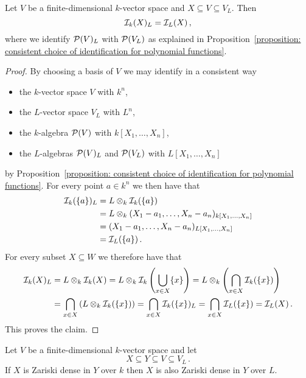 \begin{corollary}
  Let $V$ be a finite-dimensional $k$-vector space and $X \subseteq V \subseteq V_L$.
  Then
  \[
      \mathcal{I}_k(X)_L
    = \mathcal{I}_L(X) \,,
  \]
  where we identify $\mathcal{P}(V)_L$ with $\mathcal{P}(V_L)$ as explained in Proposition~\ref{proposition: consistent choice of identification for polynomial functions}.
\end{corollary}


\begin{proof}
  By choosing a basis of $V$ we may identify in a consistent way
  \begin{itemize}
    \item
      the $k$-vector space $V$ with $k^n$,
    \item
      the $L$-vector space $V_L$ with $L^n$,
    \item
      the $k$-algebra $\mathcal{P}(V)$ with $k[X_1, \dotsc, X_n]$,
    \item
      the $L$-algebras $\mathcal{P}(V)_L$ and $\mathcal{P}(V_L)$ with $L[X_1, \dotsc, X_n]$
  \end{itemize}
  by Proposition~\ref{proposition: consistent choice of identification for polynomial functions}.
  For every point $a \in k^n$ we then have that
  \begin{align*}
        \mathcal{I}_k(\{a\})_L
    &=  L \mathbin{\otimes}_k \mathcal{I}_k(\{a\}) \\
    &=  L \mathbin{\otimes}_k ( X_1 - a_1, \dotsc, X_n - a_n )_{ k[X_1, \dotsc, X_n] } \\
    &=  ( X_1 - a_1, \dotsc, X_n - a_n )_{ L[X_1, \dotsc, X_n] }  \\
    &=  \mathcal{I}_L(\{a\}) \,.
  \end{align*}
  For every subset $X \subseteq W$ we therefore have that
  \begin{align*}
        \mathcal{I}_k(X)_L
    &=  L \mathbin{\otimes}_k \mathcal{I}_k(X)
     =  L \mathbin{\otimes}_k \mathcal{I}_k\left( \bigcup_{x \in X} \{x\} \right)
     =  L \mathbin{\otimes}_k \left( \bigcap_{x \in X} \mathcal{I}_k(\{x\}) \right)  \\
    &=  \bigcap_{x \in X} \left( L \mathbin{\otimes}_k \mathcal{I}_k(\{x\}) \right)
     =  \bigcap_{x \in X} \mathcal{I}_k(\{x\})_L
     =  \bigcap_{x \in X} \mathcal{I}_L(\{x\})
     =  \mathcal{I}_L(X) \,.
  \end{align*}
  This proves the claim.
\end{proof}


\begin{corollary}
  \label{corollary: Zariski dense scalar extension}
  Let $V$ be a finite-dimensional $k$-vector space and let
  \[
              X
    \subseteq Y
    \subseteq V
    \subseteq V_L \,.
  \]
  If $X$ is Zariski dense in $Y$ over $k$ then $X$ is also Zariski dense in $Y$ over $L$.
\end{corollary}


